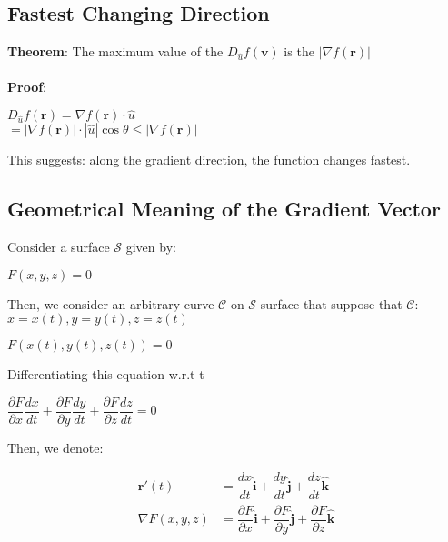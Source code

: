 \documentclass[UTF8,a4paper, 10pt, openany]{svmono}
\begin{document}
\subsection{Fastest Changing Direction}
\textbf{Theorem}: The maximum value of the $D_{\hat{u}}f(\mathbf{v})$ is the $|\nabla f(\mathbf{r})|$\\ \\

\textbf{Proof}:

\begin{center}
$D_{\hat{u}}f(\mathbf{r})=\nabla f(\mathbf{r})\cdot \hat{u}$\\
$= |\nabla f(\mathbf{r})|\cdot |\hat{u}|\cos \theta \leq |\nabla f(\mathbf{r})|$
\end{center}

This suggests: along the gradient direction, the function changes fastest.

\subsection{Geometrical Meaning of the Gradient Vector}
Consider a surface $\mathcal{S}$ given by:

\begin{center}
$F(x,y,z)=0$
\end{center}

Then, we consider an arbitrary curve $\mathcal{C}$ on $\mathcal{S}$ surface that suppose that $\mathcal{C}$: $x=x(t),y=y(t),z=z(t)$

\begin{center}
$F(x(t),y(t),z(t))=0$
\end{center}

Differentiating this equation w.r.t t

\begin{center}
$\dfrac{\partial F}{\partial x}\dfrac{dx}{dt}+\dfrac{\partial F}{\partial y}\dfrac{dy}{dt}+\dfrac{\partial F}{\partial z}\dfrac{dz}{dt}=0$
\end{center}

Then, we denote:

\begin{align*}
\mathbf{r}'(t)&=\dfrac{dx}{dt}\mathbf{\hat{i}}+\dfrac{dy}{dt}\mathbf{\hat{j}}+\dfrac{dz}{dt}\mathbf{\hat{k}}\\
\nabla F(x,y,z)&=\dfrac{\partial F}{\partial x}\mathbf{\hat{i}}+\dfrac{\partial F}{\partial y}\mathbf{\hat{j}}+\dfrac{\partial F}{\partial z}\mathbf{\hat{k}}\\
\end{align*}
\end{document}
